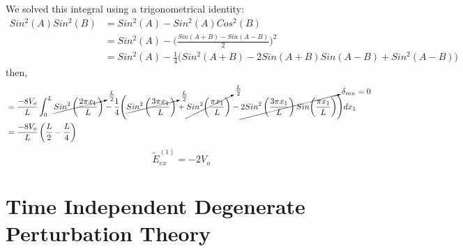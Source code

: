 \documentclass[12pt,fancychapters]{report}
\numberwithin{equation}{section}
\begin{document}
We solved this integral using a trigonometrical identity:
\begin{align*}
	Sin^2{(A)}Sin^2{(B)} &= Sin^2{(A)}-Sin^2{(A)}Cos^2{(B)}\\
	&=Sin^2(A)-\Bigg(\frac{Sin(A+B)-Sin(A-B)}{2}\Bigg)^2\\
	&= Sin^2 (A) - \frac{1}{4}\Bigg(Sin^2(A+B)-2Sin(A+B)Sin(A-B)+Sin^2(A-B)\Bigg)
\end{align*}
then, 
\begin{align*}
	& = \frac{-8V_o}{L}\int_{0}^{L}\cancelto{\frac{L}{2}}{Sin^2\left(\frac{2\pi x_1}{L}\right)}-
	\frac{1}{4}\Bigg(\cancelto{\frac{L}{2}}{Sin^2\left(\frac{3\pi x_1}{L}\right)}
	+\cancelto{\frac{L}{2}}{Sin^2\bigg(\frac{\pi x_1}{L}\bigg)}
	-\cancelto{\mathlarger{\delta_{mn}=0}}{2 Sin^2\left(\frac{3\pi x_1}{L}\right)
Sin\bigg(\frac{\pi x_1}{L}\bigg)}\Bigg)dx_1\\
	&= \frac{-8V_o}{L}\left(\frac{L}{2}-\frac{L}{4}\right)
\end{align*}
\begin{equation*}
	\boxed{\tilde{E}^{(1)}_{ex}= -2V_o}
\end{equation*}
\newpage
\chapter{Time Independent Degenerate Perturbation Theory}
\end{document}
